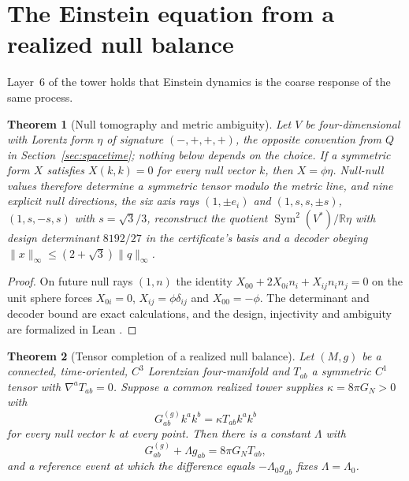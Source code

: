 \documentclass[11pt]{article}
\newtheorem{theorem}{Theorem}[section]
\theoremstyle{definition}
\theoremstyle{remark}
\begin{document}
\section{The Einstein equation from a realized null balance}
\label{sec:einstein}

Layer~6 of the tower holds that Einstein dynamics is the coarse response of
the same process.

\begin{theorem}[Null tomography and metric ambiguity]
\label{thm:null-tomography}
Let $V$ be four-dimensional with Lorentz form $\eta$ of signature $(-,+,+,+)$, the opposite convention from $Q$ in Section~\ref{sec:spacetime}; nothing below depends on the choice. If a symmetric form $X$
satisfies $X(k,k)=0$ for every null vector $k$, then $X=\phi\eta$. Null-null
values therefore determine a symmetric tensor modulo the metric line, and
nine explicit null directions, the six axis rays $(1,\pm e_i)$ and
$(1,s,s,\pm s)$, $(1,s,-s,s)$ with $s=\sqrt3/3$, reconstruct the quotient
$\operatorname{Sym}^2(V^*)/\mathbb R\eta$ with design determinant $8192/27$ in the certificate's basis and a decoder obeying $\lVert x\rVert_\infty\le(2+\sqrt3)\lVert q\rVert_\infty$.
\end{theorem}

\begin{proof}
On future null rays $(1,n)$ the identity
$X_{00}+2X_{0i}n_i+X_{ij}n_in_j=0$ on the unit sphere forces $X_{0i}=0$,
$X_{ij}=\phi\delta_{ij}$ and $X_{00}=-\phi$. The determinant and decoder
bound are exact calculations, and the design, injectivity and ambiguity are
formalized in Lean \cite{ophrepo,ophEinstein}.
\end{proof}

\begin{theorem}[Tensor completion of a realized null balance]
\label{thm:einstein}
Let $(M,g)$ be a connected, time-oriented, $C^3$ Lorentzian four-manifold
and $T_{ab}$ a symmetric $C^1$ tensor with $\nabla^aT_{ab}=0$. Suppose a
common realized tower supplies $\kappa=8\pi G_N>0$ with
\begin{equation}
G^{(g)}_{ab}k^ak^b=\kappa T_{ab}k^ak^b
\label{eq:null-balance}
\end{equation}
for every null vector $k$ at every point. Then there is a constant $\Lambda$
with
\begin{equation}
G^{(g)}_{ab}+\Lambda g_{ab}=8\pi G_NT_{ab},
\label{eq:einstein}
\end{equation}
and a reference event at which the difference equals $-\Lambda_0g_{ab}$ fixes
$\Lambda=\Lambda_0$.
\end{theorem}
\end{document}
